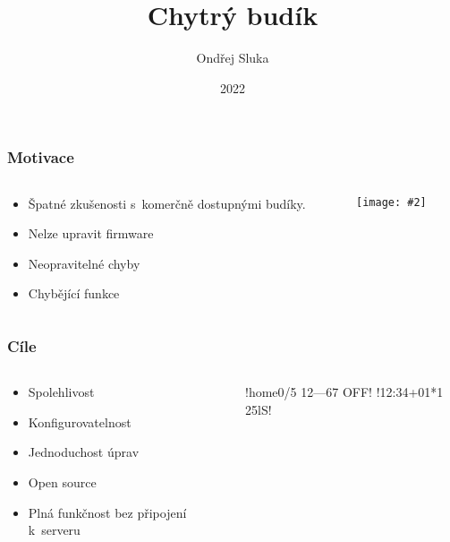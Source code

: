 \documentclass[
    utf8,
    aspectratio=169,
    17pt,  %
]{beamer}
\title{Chytrý budík}
\author{Ondřej Sluka}
\date{2022}
\newcommand{\fullsizegraphics}[2][]{%
    \centering%
    \texttt{[image: \#2]}%
}
\begin{document}
\frame{\titlepage}

\begin{frame}
    \frametitle{Motivace}
    \begin{columns}
        \begin{column}{0.5\textwidth}
            \begin{itemize}
                \item Špatné zkušenosti s~komerčně dostupnými budíky.
                \item Nelze upravit firmware
                \item Neopravitelné chyby
                \item Chybějící funkce
            \end{itemize}
        \end{column}
        \begin{column}{0.5\textwidth}
            \fullsizegraphics{sencor-SRC-330-GN}
        \end{column}
    \end{columns}
\end{frame}

\begin{frame}[fragile]
    \frametitle{Cíle}
    \begin{columns}
        \begin{column}{0.6\textwidth}
            \begin{itemize}
                \item \alert{Spolehlivost}
                \item Konfigurovatelnost
                \item Jednoduchost úprav%
                \item Open source
                \item Plná funkčnost bez připojení k~serveru
            \end{itemize}
        \end{column}
        \begin{column}{0.4\textwidth}
            !{home}0/5 12---67 OFF!
                       !12:34+01*1  25lS!
        \end{column}
    \end{columns}
\end{frame}
\end{document}
